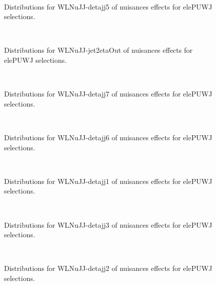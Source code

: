 \begin{figure}[htbp]  
\centering 
\\ 
\caption{ 
   Distributions for WLNuJJ-detajj5 of nuisances effects for elePUWJ selections.
} 
\label{fig:WLNuJJ_detajj5_elePUWJ} 
\end{figure} 




\begin{figure}[htbp]  
\centering 
\\ 
\caption{ 
   Distributions for WLNuJJ-jet2etaOut of nuisances effects for elePUWJ selections.
} 
\label{fig:WLNuJJ_jet2etaOut_elePUWJ} 
\end{figure} 




\begin{figure}[htbp]  
\centering 
\\ 
\caption{ 
   Distributions for WLNuJJ-detajj7 of nuisances effects for elePUWJ selections.
} 
\label{fig:WLNuJJ_detajj7_elePUWJ} 
\end{figure} 




\begin{figure}[htbp]  
\centering 
\\ 
\caption{ 
   Distributions for WLNuJJ-detajj6 of nuisances effects for elePUWJ selections.
} 
\label{fig:WLNuJJ_detajj6_elePUWJ} 
\end{figure} 




\begin{figure}[htbp]  
\centering 
\\ 
\caption{ 
   Distributions for WLNuJJ-detajj1 of nuisances effects for elePUWJ selections.
} 
\label{fig:WLNuJJ_detajj1_elePUWJ} 
\end{figure} 




\begin{figure}[htbp]  
\centering 
\\ 
\caption{ 
   Distributions for WLNuJJ-detajj3 of nuisances effects for elePUWJ selections.
} 
\label{fig:WLNuJJ_detajj3_elePUWJ} 
\end{figure} 




\begin{figure}[htbp]  
\centering 
\\ 
\caption{ 
   Distributions for WLNuJJ-detajj2 of nuisances effects for elePUWJ selections.
} 
\label{fig:WLNuJJ_detajj2_elePUWJ} 
\end{figure} 




